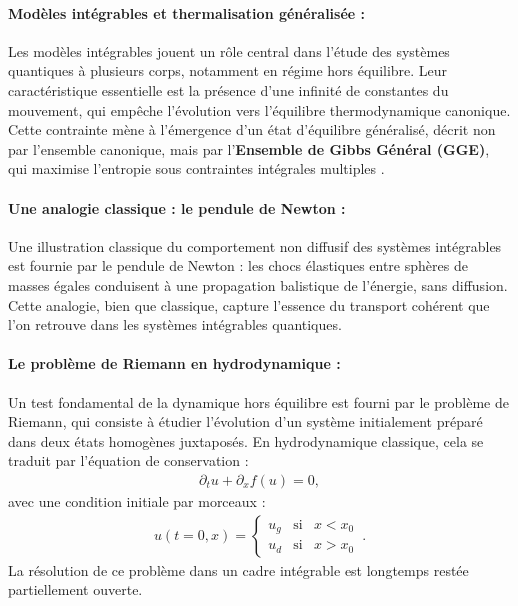 \paragraph{Modèles intégrables et thermalisation généralisée :}
Les modèles intégrables jouent un rôle central dans l’étude des systèmes quantiques à plusieurs corps, notamment en régime hors équilibre. Leur caractéristique essentielle est la présence d’une infinité de constantes du mouvement, qui empêche l’évolution vers l’équilibre thermodynamique canonique. Cette contrainte mène à l’émergence d’un état d’équilibre généralisé, décrit non par l’ensemble canonique, mais par l’{\bf Ensemble de Gibbs Général (GGE)}, qui maximise l’entropie sous contraintes intégrales multiples .

\paragraph{Une analogie classique : le pendule de Newton :}
Une illustration classique du comportement non diffusif des systèmes intégrables est fournie par le pendule de Newton : les chocs élastiques entre sphères de masses égales conduisent à une propagation balistique de l’énergie, sans diffusion. Cette analogie, bien que classique, capture l’essence du transport cohérent que l’on retrouve dans les systèmes intégrables quantiques.

\paragraph{Le problème de Riemann en hydrodynamique :}
Un test fondamental de la dynamique hors équilibre est fourni par le problème de Riemann, qui consiste à étudier l’évolution d’un système initialement préparé dans deux états homogènes juxtaposés. En hydrodynamique classique, cela se traduit par l’équation de conservation :
\begin{eqnarray*}
	\partial_t u + \partial_x f(u) = 0,
\end{eqnarray*}
avec une condition initiale par morceaux :
\begin{eqnarray*}
	u(t=0 , x) = \left \{\begin{array}{rcl} u_g & \text{si} & x<x_0 \\ u_d & \text{si} & x > x_0 \end{array} \right. \,.
\end{eqnarray*}
La résolution de ce problème dans un cadre intégrable est longtemps restée partiellement ouverte.

